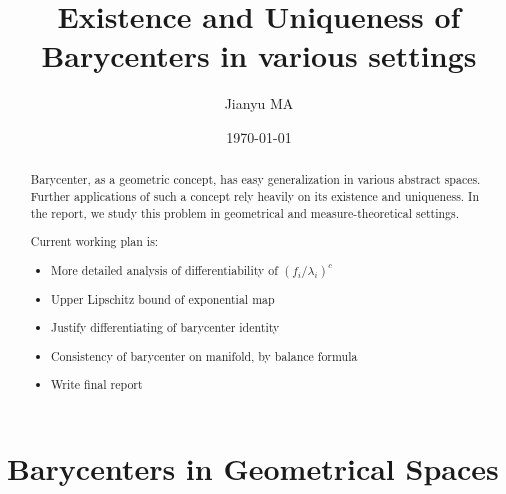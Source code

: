 \documentclass{report}
\title{Existence and Uniqueness of Barycenters in various settings}
\author{Jianyu MA}
\date{\today}
\theoremstyle{remark}
\theoremstyle{definition}
\begin{document}
\maketitle

\begin{abstract}
	Barycenter, as a geometric concept, has easy generalization in various abstract spaces. Further applications of such a concept rely heavily on its existence and uniqueness. In the report, we study this problem in geometrical and measure-theoretical settings.

	Current working plan is:
	\begin{itemize}
		\item More detailed analysis of differentiability of $(f_i / \lambda_i)^c$
		\item Upper Lipschitz bound of exponential map
		\item Justify differentiating of barycenter identity
		\item Consistency of barycenter on manifold, by balance formula
		\item Write final report
	\end{itemize}
\end{abstract}

\tableofcontents
{}


\part{Barycenters in Geometrical Spaces}


\end{document}
